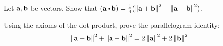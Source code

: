 \begin{ex} Let $\vect{a},\vect{b}$ be vectors. Show that $(\vect{a}\dotprod \vect{b}) =\frac{1}{4}(\norm{
\vect{a}+\vect{b}} ^{2}-\norm{\vect{a}-\vect{b}} ^{2})$.
\end{ex}

\begin{ex} Using the axioms of the dot product, prove the parallelogram identity:
\begin{equation*}
\norm{\vect{a}+\vect{b}} ^{2}+\norm{\vect{a}-\vect{b}}
^{2}=2\norm{\vect{a}} ^{2}+2\norm{\vect{b}
} ^{2}
\end{equation*}
\end{ex}

